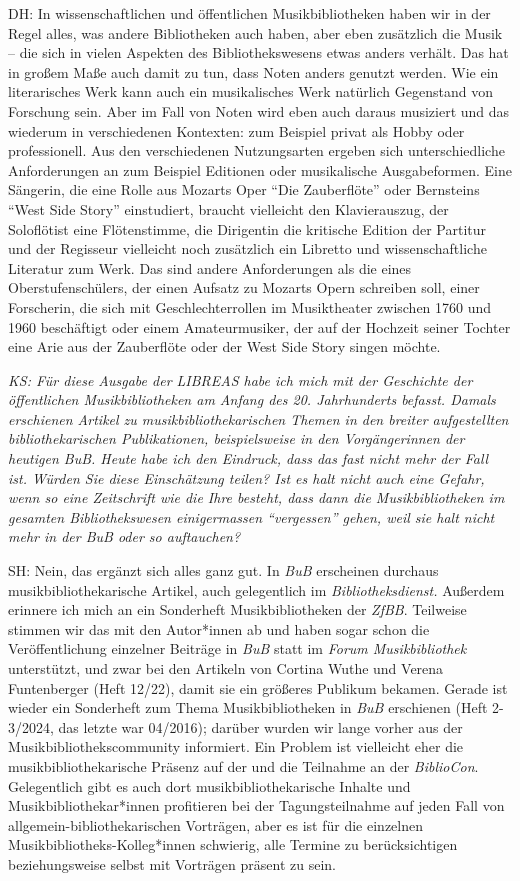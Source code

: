 \documentclass[a4paper,
fontsize=11pt,
oneside,
numbers=noperiodatend,
parskip=half-,
bibliography=totoc,
final
]{scrartcl}
\begin{document}
DH: In wissenschaftlichen und öffentlichen Musikbibliotheken haben wir
in der Regel alles, was andere Bibliotheken auch haben, aber eben
zusätzlich die Musik -- die sich in vielen Aspekten des
Bibliothekswesens etwas anders verhält. Das hat in großem Maße auch
damit zu tun, dass Noten anders genutzt werden. Wie ein literarisches
Werk kann auch ein musikalisches Werk natürlich Gegenstand von Forschung
sein. Aber im Fall von Noten wird eben auch daraus musiziert und das
wiederum in verschiedenen Kontexten: zum Beispiel privat als Hobby oder
professionell. Aus den verschiedenen Nutzungsarten ergeben sich
unterschiedliche Anforderungen an zum Beispiel Editionen oder
musikalische Ausgabeformen. Eine Sängerin, die eine Rolle aus Mozarts
Oper \enquote{Die Zauberflöte} oder Bernsteins \enquote{West Side Story}
einstudiert, braucht vielleicht den Klavierauszug, der Soloflötist eine
Flötenstimme, die Dirigentin die kritische Edition der Partitur und der
Regisseur vielleicht noch zusätzlich ein Libretto und wissenschaftliche
Literatur zum Werk. Das sind andere Anforderungen als die eines
Oberstufenschülers, der einen Aufsatz zu Mozarts Opern schreiben soll,
einer Forscherin, die sich mit Geschlechterrollen im Musiktheater
zwischen 1760 und 1960 beschäftigt oder einem Amateurmusiker, der auf
der Hochzeit seiner Tochter eine Arie aus der Zauberflöte oder der West
Side Story singen möchte.

\emph{KS: Für diese Ausgabe der LIBREAS habe ich mich mit der Geschichte
der öffentlichen Musikbibliotheken am Anfang des 20. Jahrhunderts
befasst. Damals erschienen Artikel zu musikbibliothekarischen Themen in
den breiter aufgestellten bibliothekarischen Publikationen,
beispielsweise in den Vorgängerinnen der heutigen BuB. Heute habe ich
den Eindruck, dass das fast nicht mehr der Fall ist. Würden Sie diese
Einschätzung teilen? Ist es halt nicht auch eine Gefahr, wenn so eine
Zeitschrift wie die Ihre besteht, dass dann die Musikbibliotheken im
gesamten Bibliothekswesen einigermassen \enquote{vergessen} gehen, weil
sie halt nicht mehr in der BuB oder so auftauchen?}

SH: Nein, das ergänzt sich alles ganz gut. In \emph{BuB} erscheinen
durchaus musikbibliothekarische Artikel, auch gelegentlich im
\emph{Bibliotheksdienst.} Außerdem erinnere ich mich an ein Sonderheft
Musikbibliotheken der \emph{ZfBB}. Teilweise stimmen wir das mit den
Autor*innen ab und haben sogar schon die Veröffentlichung einzelner
Beiträge in \emph{BuB} statt im \emph{Forum Musikbibliothek}
unterstützt, und zwar bei den Artikeln von Cortina Wuthe und Verena
Funtenberger (Heft 12/22), damit sie ein größeres Publikum bekamen.
Gerade ist wieder ein Sonderheft zum Thema Musikbibliotheken in
\emph{BuB} erschienen (Heft 2-3/2024, das letzte war 04/2016); darüber
wurden wir lange vorher aus der Musikbibliothekscommunity informiert.
Ein Problem ist vielleicht eher die musikbibliothekarische Präsenz auf
der und die Teilnahme an der \emph{BiblioCon}. Gelegentlich gibt es auch
dort musikbibliothekarische Inhalte und Musikbibliothekar*innen
profitieren bei der Tagungsteilnahme auf jeden Fall von
allgemein-bibliothekarischen Vorträgen, aber es ist für die einzelnen
Musikbibliotheks-Kolleg*innen schwierig, alle Termine zu berücksichtigen
beziehungsweise selbst mit Vorträgen präsent zu sein.
\end{document}
